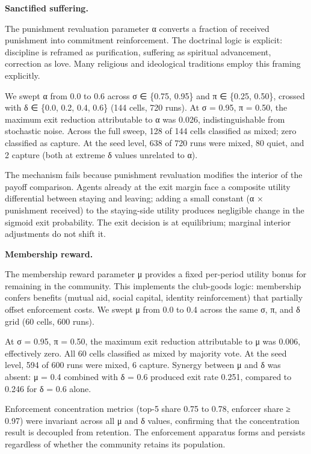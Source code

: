 \documentclass[12pt]{article}
\begin{document}
%

\textbf{Sanctified suffering.}

The punishment revaluation parameter α converts a fraction of received punishment into commitment reinforcement. The doctrinal logic is explicit: discipline is reframed as purification, suffering as spiritual advancement, correction as love. Many religious and ideological traditions employ this framing explicitly.

We swept α from 0.0 to 0.6 across σ ∈ \{0.75, 0.95\} and π ∈ \{0.25, 0.50\}, crossed with δ ∈ \{0.0, 0.2, 0.4, 0.6\} (144 cells, 720 runs). At σ = 0.95, π = 0.50, the maximum exit reduction attributable to α was 0.026, indistinguishable from stochastic noise. Across the full sweep, 128 of 144 cells classified as mixed; zero classified as capture. At the seed level, 638 of 720 runs were mixed, 80 quiet, and 2 capture (both at extreme δ values unrelated to α).

The mechanism fails because punishment revaluation modifies the interior of the payoff comparison. Agents already at the exit margin face a composite utility differential between staying and leaving; adding a small constant (α × punishment received) to the staying-side utility produces negligible change in the sigmoid exit probability. The exit decision is at equilibrium; marginal interior adjustments do not shift it.

%

\textbf{Membership reward.}

The membership reward parameter μ provides a fixed per-period utility bonus for remaining in the community. This implements the club-goods logic: membership confers benefits (mutual aid, social capital, identity reinforcement) that partially offset enforcement costs. We swept μ from 0.0 to 0.4 across the same σ, π, and δ grid (60 cells, 600 runs).

At σ = 0.95, π = 0.50, the maximum exit reduction attributable to μ was 0.006, effectively zero. All 60 cells classified as mixed by majority vote. At the seed level, 594 of 600 runs were mixed, 6 capture. Synergy between μ and δ was absent: μ = 0.4 combined with δ = 0.6 produced exit rate 0.251, compared to 0.246 for δ = 0.6 alone.

Enforcement concentration metrics (top-5 share 0.75 to 0.78, enforcer share ≥ 0.97) were invariant across all μ and δ values, confirming that the concentration result is decoupled from retention. The enforcement apparatus forms and persists regardless of whether the community retains its population.
\end{document}
